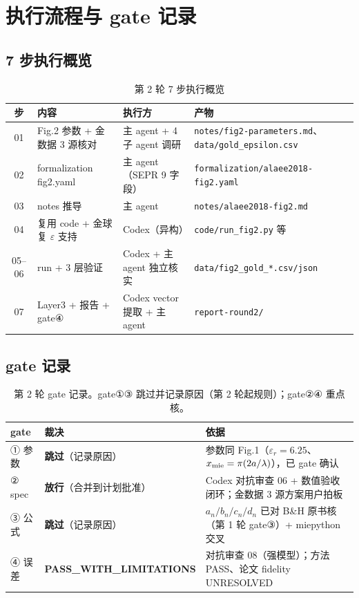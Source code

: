 \section{执行流程与 gate 记录}

\subsection{7 步执行概览}

\begin{table}[H]
\centering
\small
\begin{tabular}{clll}
\toprule
步 & 内容 & 执行方 & 产物 \\
\midrule
01 & Fig.2 参数 + 金数据 3 源核对 & 主 agent + 4 子 agent 调研 & \texttt{notes/fig2-parameters.md}、\texttt{data/gold\_epsilon.csv} \\
02 & formalization fig2.yaml & 主 agent（SEPR 9 字段） & \texttt{formalization/alaee2018-fig2.yaml} \\
03 & notes 推导 & 主 agent & \texttt{notes/alaee2018-fig2.md} \\
04 & 复用 code + 金球复 $\varepsilon$ 支持 & Codex（异构） & \texttt{code/run\_fig2.py} 等 \\
05--06 & run + 3 层验证 & Codex + 主 agent 独立核实 & \texttt{data/fig2\_gold\_*.csv/json} \\
07 & Layer3 + 报告 + gate④ & Codex vector 提取 + 主 agent & \texttt{report-round2/} \\
\bottomrule
\end{tabular}
\caption{第 2 轮 7 步执行概览}
\end{table}

\subsection{gate 记录}

\begin{table}[H]
\centering
\small
\begin{tabular}{lll}
\toprule
gate & 裁决 & 依据 \\
\midrule
① 参数 & \textbf{跳过}（记录原因） & 参数同 Fig.1（$\varepsilon_r=6.25$、$x_{\rm mie}=\pi(2a/\lambda)$），已 gate 确认 \\
② spec & \textbf{放行}（合并到计划批准） & Codex 对抗审查 06 + 数值验收闭环；金数据 3 源方案用户拍板 \\
③ 公式 & \textbf{跳过}（记录原因） & $a_n/b_n/c_n/d_n$ 已对 B\&H 原书核（第 1 轮 gate③）+ miepython 交叉 \\
④ 误差 & \textbf{PASS\_WITH\_LIMITATIONS} & 对抗审查 08（强模型）；方法 PASS、论文 fidelity UNRESOLVED \\
\bottomrule
\end{tabular}
\caption{第 2 轮 gate 记录。gate①③ 跳过并记录原因（第 2 轮起规则）；gate②④ 重点核。}
\end{table}


